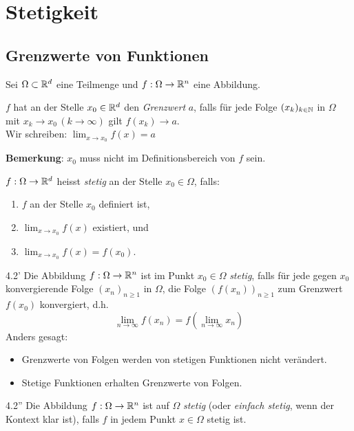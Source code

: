\chapter{Stetigkeit}
\section{Grenzwerte von Funktionen}
Sei $\Omega \subset \mathbb{R}^{d}$ eine Teilmenge und $f:\Omega \to \mathbb{R}^{n}$ eine Abbildung.

\begin{definition}{4.1}
$f$ hat an der Stelle $x_{0} \in \mathbb{R}^{d}$ den \emph{Grenzwert} $a$, falls für jede Folge $(x_k)_{k\in \mathbb{N}}$ in $\Omega$ mit $x_{k} \to x_{0}\, (k \to \infty)$ gilt $f(x_{k}) \to a$. \\

Wir schreiben: $\lim_{x\to x_{0}}{f(x)} = a$
\end{definition}
\textbf{Bemerkung}: $x_{0}$ muss nicht im Definitionsbereich von $f$ sein.
\begin{definition}{4.2}
$f:\Omega \to \mathbb{R}^{d}$ heisst \emph{stetig} an der Stelle $x_{0} \in \Omega$, falls:
\begin{enumerate}
\item $f$ an der Stelle $x_{0}$ definiert ist,
\item $\lim_{x\to x_{0}}{f(x)}$ existiert, und
\item $\lim_{x\to x_{0}}{f(x)} = f(x_{0})$.
\end{enumerate}
\end{definition}
\begin{definition}{4.2'}
Die Abbildung $f:\Omega \to \mathbb{R}^{n}$ ist im Punkt $x_{0} \in \Omega$ \emph{stetig}, falls für jede gegen $x_{0}$ konvergierende Folge $(x_{n})_{n\geq 1}$ in $\Omega$, die Folge $(f(x_{n}))_{n\geq 1}$ zum Grenzwert $f(x_{0})$ konvergiert, d.h.
\[\lim_{n\to\infty}f(x_{n}) = f(\lim_{n\to\infty}x_{n})\]
Anders gesagt:
\begin{itemize}
\item Grenzwerte von Folgen werden von stetigen Funktionen nicht verändert.
\item Stetige Funktionen erhalten Grenzwerte von Folgen.
\end{itemize}
\end{definition}
\begin{definition}{4.2''}
Die Abbildung $f:\Omega\to\mathbb{R}^{n}$ ist auf $\Omega$ \emph{stetig} (oder \emph{einfach stetig}, wenn der Kontext klar ist), falls $f$ in jedem Punkt $x\in\Omega$ stetig ist.
\end{definition}
